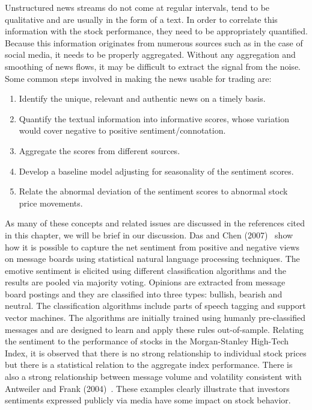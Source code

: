 Unstructured news streams do not come at regular intervals, tend to be qualitative and are usually in the form of a text. In order to correlate this information with the stock performance, they need to be appropriately quantified. Because this information originates from numerous sources such as in the case of social media, it needs to be properly aggregated. Without any aggregation and smoothing of news flows, it may be difficult to extract the signal from the noise. Some common steps involved in making the news usable for trading are:
	\begin{enumerate}[--]
	\item Identify the unique, relevant and authentic news on a timely basis.
	\item Quantify the textual information into informative scores, whose variation would cover negative to positive sentiment/connotation.
	\item Aggregate the scores from different sources.
	\item Develop a baseline model adjusting for seasonality of the sentiment scores.
	\item Relate the abnormal deviation of the sentiment scores to abnormal stock price movements. 
	\end{enumerate}


As many of these concepts and related issues are discussed in the references cited in this chapter, we will be brief in our discussion. Das and Chen (2007)~\cite{daschen} show how it is possible to capture the net sentiment from positive and negative views on message boards using statistical natural language processing techniques. The emotive sentiment is elicited using different classification algorithms and the results are pooled via majority voting. Opinions are extracted from message board postings and they are classified into three types: bullish, bearish and neutral. The classification algorithms include parts of speech tagging and support vector machines. The algorithms are initially trained using humanly pre-classified messages and are designed to learn and apply these rules out-of-sample. Relating the sentiment to the performance of stocks in the Morgan-Stanley High-Tech Index, it is observed that there is no strong relationship to individual stock prices but there is a statistical relation to the aggregate index performance. There is also a strong relationship between message volume and volatility consistent with Antweiler and Frank (2004)~\cite{antweiler2004all}. These examples clearly illustrate that investors sentiments expressed publicly via media have some impact on stock behavior. 


